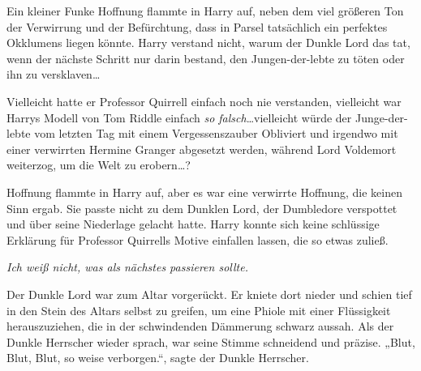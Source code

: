 Ein kleiner Funke Hoffnung flammte in Harry auf, neben dem viel größeren Ton der Verwirrung und der Befürchtung, dass in Parsel tatsächlich ein perfektes Okklumens liegen könnte. Harry verstand nicht, warum der Dunkle Lord das tat, wenn der nächste Schritt nur darin bestand, den Jungen-der-lebte zu töten oder ihn zu versklaven…

Vielleicht hatte er Professor Quirrell einfach noch nie verstanden, vielleicht war Harrys Modell von Tom Riddle einfach \emph{so falsch}…vielleicht würde der Junge-der-lebte vom letzten Tag mit einem Vergessenszauber Obliviert und irgendwo mit einer verwirrten Hermine Granger abgesetzt werden, während Lord Voldemort weiterzog, um die Welt zu erobern…?

Hoffnung flammte in Harry auf, aber es war eine verwirrte Hoffnung, die keinen Sinn ergab. Sie passte nicht zu dem Dunklen Lord, der Dumbledore verspottet und über seine Niederlage gelacht hatte. Harry konnte sich keine schlüssige Erklärung für Professor Quirrells Motive einfallen lassen, die so etwas zuließ.

\emph{Ich weiß nicht, was als nächstes passieren sollte.}

Der Dunkle Lord war zum Altar vorgerückt. Er kniete dort nieder und schien tief in den Stein des Altars selbst zu greifen, um eine Phiole mit einer Flüssigkeit herauszuziehen, die in der schwindenden Dämmerung schwarz aussah.
Als der Dunkle Herrscher wieder sprach, war seine Stimme schneidend und präzise.
„Blut, Blut, Blut, so weise verborgen.“, sagte der Dunkle Herrscher.


